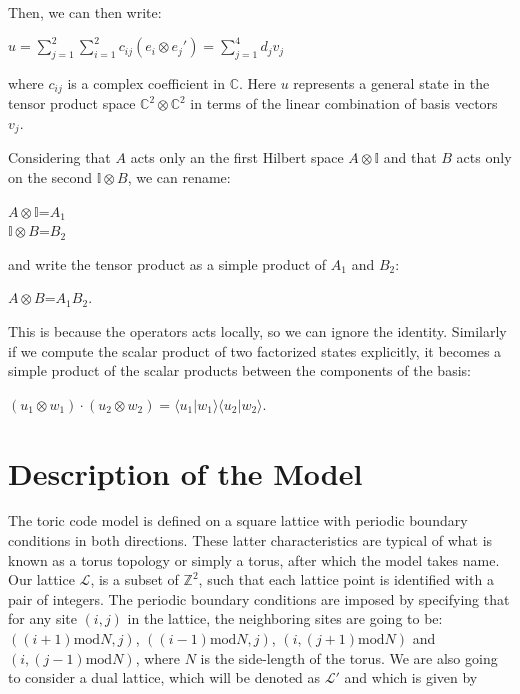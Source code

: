 \documentclass{Configuration_Files/PoliMi3i_thesis}
\begin{document}
Then, we can then write:

\begin{center}
  $u = \sum_{j=1}^{2} \sum_{i=1}^{2} c_{ij} (e_i \otimes e_j') = \sum_{j=1}^{4} d_j v_j$
\end{center}

where $c_{ij}$ is a complex coefficient in $\mathbb{C}$. Here $u$ represents a general state  in the tensor product space $\mathbb{C}^2 \otimes \mathbb{C}^2$ in terms of the linear combination of basis vectors $v_j$.


Considering that $A$ acts only an the first Hilbert space $A \otimes \mathbb{I}$ and that $B$ acts only on the second $\mathbb{I} \otimes B$, we can rename:

\begin{center}
	$A \otimes \mathbb{I}$=$A_1$ \\
	$\mathbb{I} \otimes B$=$B_2$
\end{center}

and write the tensor product as a simple product of $A_1$ and $B_2$:

\begin{center}
	$A \otimes B$=$A_1$$B_2$.
\end{center}

This is because the operators acts locally, so we can ignore the identity. \newline
Similarly if we compute the scalar product of two factorized states explicitly, it becomes a simple product of the scalar products between the components of the basis:

\begin{center}
	$(u_1 \otimes w_1) \cdot (u_2 \otimes w_2) = \langle u_1 | w_1 \rangle \langle u_2 | w_2 \rangle$.
\end{center}








\newpage
\section{Description of the Model}
\label{sec:Model}

The toric code model is defined on a square lattice with periodic boundary conditions in both directions. These latter characteristics are typical of what is known as a torus topology or simply a torus, after which the model takes name. Our lattice $\mathcal{L}$, is a subset of $\mathbb{Z}^{2}$, such that each lattice point is identified with a pair of integers. The periodic boundary conditions are imposed by specifying that for any site $(i, j)$ in the lattice, the neighboring sites are going to be: $((i+1)\mathrm{mod}N, j)$, $((i-1)\mathrm{mod} N, j)$, $(i, (j+1)\mathrm{mod}N)$ and $(i, (j-1)\mathrm{mod}N)$, where $N$ is the side-length of the torus. We are also going to consider a dual lattice, which will be denoted as $\mathcal{L}'$ and which is given by 
\end{document}
